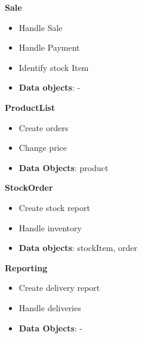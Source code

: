 \begin{multicols}{2}
	\textbf{Sale}
	\begin{flushleft}
		\begin{itemize}[noitemsep]
			\item Handle Sale
			\item Handle Payment
			\item Identify stock Item
			\item \textbf{Data objects}: -  
		\end{itemize}
	\end{flushleft}
	
	
	\vfill
	\columnbreak
	\textbf{ProductList}
	\begin{flushleft}
		\begin{itemize}[noitemsep]
			\item Create orders
			\item Change price
			\item \textbf{Data Objects}: product
			
			
		\end{itemize}
	\end{flushleft}
	
\end{multicols}




\begin{multicols}{2}
	\textbf{StockOrder}
	\begin{flushleft}
		\begin{itemize}[noitemsep]
			\item Create stock report
			\item Handle inventory
			\item \textbf{Data objects}: stockItem, order
		\end{itemize}
	\end{flushleft}
	
	
	\vfill
	\columnbreak
	\textbf{Reporting}
	\begin{flushleft}
		\begin{itemize}[noitemsep]
			\item Create delivery report
			\item Handle deliveries
			\item \textbf{Data Objects}: - 
			
		\end{itemize}
	\end{flushleft}
\end{multicols}



